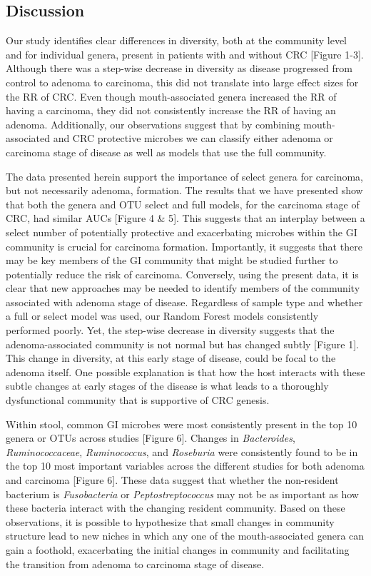 \documentclass[12pt,]{article}
\begin{document}
\newpage

\subsection{Discussion}\label{discussion}

Our study identifies clear differences in diversity, both at the
community level and for individual genera, present in patients with and
without CRC {[}Figure 1-3{]}. Although there was a step-wise decrease in
diversity as disease progressed from control to adenoma to carcinoma,
this did not translate into large effect sizes for the RR of CRC. Even
though mouth-associated genera increased the RR of having a carcinoma,
they did not consistently increase the RR of having an adenoma.
Additionally, our observations suggest that by combining
mouth-associated and CRC protective microbes we can classify either
adenoma or carcinoma stage of disease as well as models that use the
full community.

The data presented herein support the importance of select genera for
carcinoma, but not necessarily adenoma, formation. The results that we
have presented show that both the genera and OTU select and full models,
for the carcinoma stage of CRC, had similar AUCs {[}Figure 4 \& 5{]}.
This suggests that an interplay between a select number of potentially
protective and exacerbating microbes within the GI community is crucial
for carcinoma formation. Importantly, it suggests that there may be key
members of the GI community that might be studied further to potentially
reduce the risk of carcinoma. Conversely, using the present data, it is
clear that new approaches may be needed to identify members of the
community associated with adenoma stage of disease. Regardless of sample
type and whether a full or select model was used, our Random Forest
models consistently performed poorly. Yet, the step-wise decrease in
diversity suggests that the adenoma-associated community is not normal
but has changed subtly {[}Figure 1{]}. This change in diversity, at this
early stage of disease, could be focal to the adenoma itself. One
possible explanation is that how the host interacts with these subtle
changes at early stages of the disease is what leads to a thoroughly
dysfunctional community that is supportive of CRC genesis.

Within stool, common GI microbes were most consistently present in the
top 10 genera or OTUs across studies {[}Figure 6{]}. Changes in
\emph{Bacteroides}, \emph{Ruminococcaceae}, \emph{Ruminococcus}, and
\emph{Roseburia} were consistently found to be in the top 10 most
important variables across the different studies for both adenoma and
carcinoma {[}Figure 6{]}. These data suggest that whether the
non-resident bacterium is \emph{Fusobacteria} or
\emph{Peptostreptococcus} may not be as important as how these bacteria
interact with the changing resident community. Based on these
observations, it is possible to hypothesize that small changes in
community structure lead to new niches in which any one of the
mouth-associated genera can gain a foothold, exacerbating the initial
changes in community and facilitating the transition from adenoma to
carcinoma stage of disease.
\end{document}
